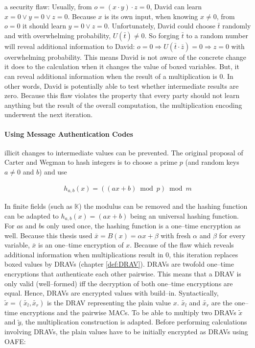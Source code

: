 a security flaw: Usually, from $o = (x \cdot y) \cdot z = 0$, David can learn $x
= 0 \vee y = 0 \vee z = 0$. Because $x$ is its own input, when knowing $x \neq
0$, from $o = 0$ it should learn $y = 0 \vee z = 0$.  Unfortunately, David could
choose $\bar{t}$ randomly and with overwhelming probability, $U(\bar{t}) \neq
0$. So forging $\bar{t}$ to a random number will reveal additional information
to David: $o = 0 \Rightarrow U(\bar{t} \cdot \bar{z}) = 0 \Rightarrow z = 0$
with overwhelming probability. This means David is not aware of the concrete
change it does to the calculation when it changes the value of boxed variables.
But, it can reveal additional information when the result of a multiplication is
$0$. In other words, David is potentially able to test whether intermediate
results are zero. Because this flaw violates the property that every party
should not learn anything but the result of the overall computation, the
multiplication encoding underwent the next iteration.

\paragraph{Using Message Authentication Codes} illicit changes to intermediate
values can be prevented. The original proposal of Carter and Wegman
\cite{carter79} to hash integers is to choose a prime $p$ (and random keys $a
\neq 0$ and $b$) and use

\begin{align*}
  h_{a,b}(x) = ((ax + b) \bmod p) \bmod m
\end{align*}

\noindent{}In finite fields (such as $\mathbb{K}$) the modulus can be removed
and the hashing function can be adapted to $h_{a,b}(x) = (ax + b)$ being an
universal hashing function. For $a$s and $b$s only used once, the hashing
function is a one--time encryption as well. Because this thesis used $\bar{x} =
B(x) = \alpha x + \beta$ with fresh $\alpha$ and $\beta$ for every variable,
$\bar{x}$ is an one--time encryption of $x$. Because of the flaw which reveals
additional information when multiplications result in $0$, this iteration
replaces boxed values by DRAVs (chapter \ref{def:DRAV}). DRAVs are twofold
one--time encryptions that authenticate each other pairwise. This means that a
DRAV is only valid (well--formed) iff the decryption of both one--time
encryptions are equal. Hence, DRAVs are encrypted values with  build--in. Syntactically, $\widetilde{x} =
(\widetilde{x_l}, \widetilde{x_r})$ is the DRAV representing the plain value
$x$. $\widetilde{x_l}$ and $\widetilde{x_r}$ are the one--time encryptions and
the pairwise MACs. To be able to multiply two DRAVs $\widetilde{x}$ and
$\widetilde{y}$, the multiplication construction is adapted. Before performing
calculations involving DRAVs, the plain values have to be initially encrypted
as DRAVs using OAFE:

